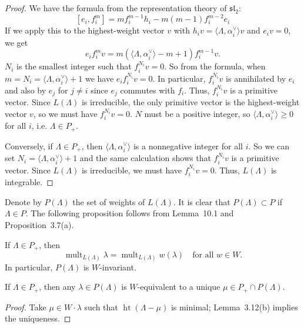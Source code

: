 \documentclass[12pt]{article}
\begin{document}
\begin{proof}
    We have the formula from the representation theory of $\mathfrak{sl}_2$:
    \[[e_i, f_i^{m}] = m f_i^{m-1} h_i - m(m-1) f_i^{m-2} e_i\]
If we apply this to the highest-weight vector $v$ with $h_i v = \langle \Lambda, \alpha_i^\vee\rangle v$ and $e_i v = 0$, we get
\[
e_i f_i^{m} v = m (\langle \Lambda, \alpha_i^\vee\rangle - m + 1) f_i^{m-1} v.
\]
$N_i$ is the smallest integer such that $f_i^{N_i} v = 0$. So from the formula, when $m=N_i=\langle\Lambda,\alpha_i^\vee\rangle+1$ we have $e_i f_i^{N_i} v = 0$. In particular, $f_i^{N_i} v$ is annihilated by $e_i$ and also by $e_j$ for $j\neq i$ since $e_j$ commutes with $f_i$. Thus, $f_i^{N_i} v$ is a primitive vector. Since $L(\Lambda)$ is irreducible, the only primitive vector is the highest-weight vector $v$, so we must have $f_i^{N_i} v = 0$. $N$ must be a positive integer, so $\langle\Lambda,\alpha_i^\vee\rangle\geq 0$ for all $i$, i.e. $\Lambda\in P_+$.

Conversely, if $\Lambda\in P_+$, then $\langle\Lambda,\alpha_i^\vee\rangle$ is a nonnegative integer for all $i$. So we can set $N_i = \langle\Lambda,\alpha_i^\vee\rangle + 1$ and the same calculation shows that $f_i^{N_i} v$ is a primitive vector. Since $L(\Lambda)$ is irreducible, we must have $f_i^{N_i} v = 0$. Thus, $L(\Lambda)$ is integrable.
\end{proof}

Denote by $P(\Lambda)$ the set of weights of $L(\Lambda)$. It is clear that
$P(\Lambda) \subset P$ if $\Lambda \in P$.
The following proposition follows from Lemma~10.1 and Proposition~3.7(a).

\begin{proposition}[10.1]
If $\Lambda \in P_+$, then
\[
\operatorname{mult}_{L(\Lambda)} \lambda
= \operatorname{mult}_{L(\Lambda)} w(\lambda)
\quad \text{for all } w \in W.
\]
In particular, $P(\Lambda)$ is $W$-invariant.
\end{proposition}

\begin{corollary}[10.1]
If $\Lambda \in P_+$, then any $\lambda \in P(\Lambda)$
is $W$-equivalent to a unique
$\mu \in P_+ \cap P(\Lambda)$.
\end{corollary}

\begin{proof}
Take $\mu \in W \cdot \lambda$ such that
$\operatorname{ht}(\Lambda - \mu)$ is minimal;
Lemma~3.12(b) implies the uniqueness.
\end{proof}
\end{document}
